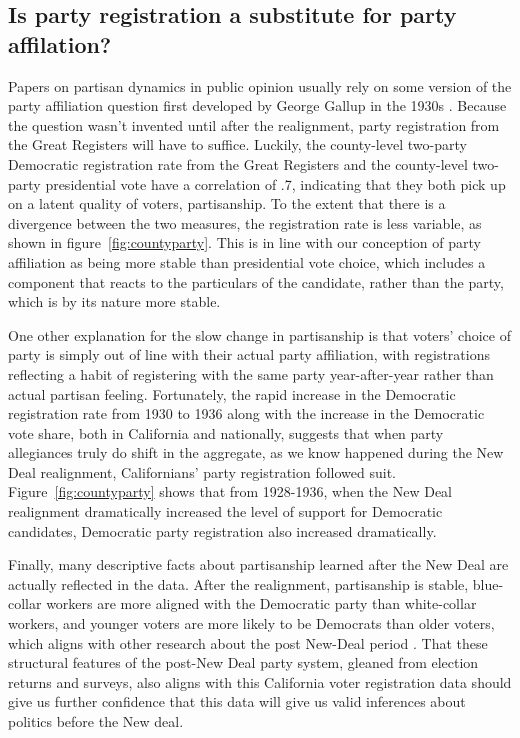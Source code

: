 \documentclass[11pt]{scrartcl}\usepackage[]{graphicx}\usepackage[]{color}
\begin{document}
\subsection*{Is party registration a substitute for party affilation?}



Papers on partisan dynamics in public opinion usually rely on some version of the party affiliation question first developed by George Gallup in the 1930s \citep{clarke2009dynamics}. Because the question wasn't invented until after the realignment, party registration from the Great Registers will have to suffice. Luckily, the county-level two-party Democratic registration rate from the Great Registers and the county-level two-party presidential vote have a correlation of .7, indicating that they both pick up on a latent quality of voters, partisanship. To the extent that there is a divergence between the two measures, the registration rate is less variable, as shown in figure~\ref{fig:countyparty}. This is in line with our conception of party affiliation as being more stable than presidential vote choice, which includes a component that reacts to the particulars of the candidate, rather than the party, which is by its nature more stable.

One other explanation for the slow change in partisanship is that voters' choice of party is simply out of line with their actual party affiliation, with registrations reflecting a habit of registering with the same party year-after-year rather than actual partisan feeling.  Fortunately, the rapid increase in the Democratic registration rate from 1930 to 1936 along with the increase in the Democratic vote share, both in California and nationally, suggests that when party allegiances truly do shift in the aggregate, as we know happened during the New Deal realignment, Californians' party registration followed suit. Figure~\ref{fig:countyparty} shows that from 1928-1936, when the New Deal realignment dramatically increased the level of support for Democratic candidates, Democratic party registration also increased dramatically.


Finally, many descriptive facts about partisanship learned after the New Deal are actually reflected in the data. After the realignment, partisanship is stable, blue-collar workers are more aligned with the Democratic party than white-collar workers, and younger voters are more likely to be Democrats than older voters, which aligns with other research about the post New-Deal period \citep{campbell1960american,alford1963role}. That these structural features of the post-New Deal party system, gleaned from election returns and surveys, also aligns with this California voter registration data should give us further confidence that this data will give us valid inferences about politics before the New deal.
\end{document}
